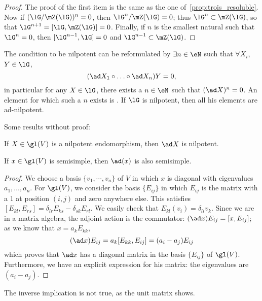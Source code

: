 \begin{proof}
The proof of the first item is the same as the one of~\ref{prop:trois_resoluble}. Now if $(\lG/\mZ(\lG))^n=0$, then $\lG^n/\mZ(\lG)=0$; thus $\lG^n\subset\mZ(\lG)$, so that $\lG^{n+1}=[\lG,\mZ(\lG)]=0$. Finally, if $n$ is the smallest natural such that $\lG^n=0$, then $[\lG^{n-1},\lG]=0$ and $\lG^{n-1}\subset\mZ(\lG)$.
\end{proof}

The condition to be nilpotent can be reformulated by $\exists n\in\eN$ such that $\forall X_i$, $Y\in\lG$,
\[
   (\ad X_1\circ\ldots\circ\ad X_n)Y=0,
\]
in particular for any $X\in\lG$, there exists a $n\in\eN$ such that $(\ad X)^n=0$. An element for which such a $n$ exists is . If $\lG$ is nilpotent, then all his elements are ad-nilpotent.

Some results without proof:

\begin{lemma}\label{lem:pre_Engel}
If $X\in\gl(V)$ is a nilpotent endomorphism, then $\ad X$ is nilpotent.
\end{lemma}

\begin{lemma}
If $x\in\gl(V)$ is semisimple, then $\ad(x)$ is also semisimple.
\end{lemma}

\begin{proof}
We choose a basis $\{v_1,\cdots,v_n\}$ of $V$ in which $x$ is diagonal with eigenvalues $a_1,\ldots,a_n$. For $\gl(V)$, we consider the basis $\{E_{ij}\}$ in which $E_{ij}$ is the matrix with a $1$ at position $(i,j)$ and zero anywhere else. This satisfies $[E_{kl},E_{rs}]=\delta_{lr}E_{ks}-\delta_{sk}E_{rl}$. We easily check that $E_{kl}(v_i)=\delta_{li}v_k$. Since we are in a matrix algebra, the adjoint action is the commutator: $(\ad x)E_{ij}=[x,E_{ij}]$; as we know that $x=a_kE_{kk}$,
\begin{equation}
 (\ad x)E_{ij}=a_k[E_{kk},E_{ij}]=(a_i-a_j)E_{ij}
\end{equation}
which proves that $\ad x$ has a diagonal matrix in the basis $\{E_{ij}\}$ of $\gl(V)$. Furthermore, we have an explicit expression for his matrix: the eigenvalues are $(a_i-a_j)$.
\end{proof}

\begin{remark}
The inverse implication is not true, as the unit matrix shows.
\end{remark}

